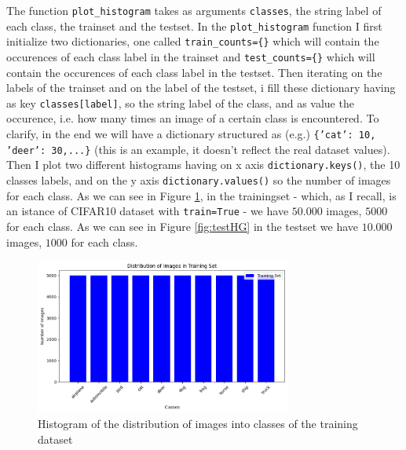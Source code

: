 \documentclass[a4paper]{article}
\begin{document}
\begin{enumerate}
    \newline The function \texttt{plot\_histogram} takes as arguments \texttt{classes}, the string label of each class, the trainset and the testset. In the \texttt{plot\_histogram} function I first initialize two dictionaries, one called \texttt{train\_counts=\{\}} which will contain the occurences of each class label in the trainset and \texttt{test\_counts=\{\}} which will contain the occurences of each class label in the testset. Then iterating on the labels of the trainset and on the label of the testset, i fill these dictionary having as key \texttt{classes[label]}, so the string label of the class, and as value the occurence, i.e. how many times an image of a certain class is encountered. To clarify, in the end we will have a dictionary structured as (e.g.) \texttt{\{'cat': 10, 'deer': 30,...\}} (this is an example, it doesn't reflect the real dataset values). Then I plot two different histograms having on x axis \texttt{dictionary.keys()}, the 10 classes labels, and on the y axis \texttt{dictionary.values()} so the number of images for each class. As we can see in Figure \ref{fig:trainHG}, in the trainingset - which, as I recall, is an istance of CIFAR10 dataset with \texttt{train=True} - we have $50.000$ images, $5000$ for each class. As we can see in Figure \ref{fig:testHG} in the testset we have $10.000$ images, $1000$ for each class.

    \begin{figure}[h]
        \centering
        \includegraphics[width=0.75\textwidth]{images/trainingHG.png}
        \caption{Histogram of the distribution of images into classes of the training dataset}
        \label{fig:trainHG}
    \end{figure}


\end{enumerate}
\end{document}
